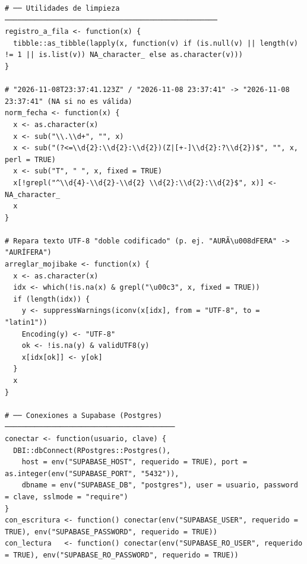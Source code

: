 \begin{lstlisting}[style=anexoR]
# ── Utilidades de limpieza ──────────────────────────────────────────────────
registro_a_fila <- function(x) {
  tibble::as_tibble(lapply(x, function(v) if (is.null(v) || length(v) != 1 || is.list(v)) NA_character_ else as.character(v)))
}

# "2026-11-08T23:37:41.123Z" / "2026-11-08 23:37:41" -> "2026-11-08 23:37:41" (NA si no es válida)
norm_fecha <- function(x) {
  x <- as.character(x)
  x <- sub("\\.\\d+", "", x)
  x <- sub("(?<=\\d{2}:\\d{2}:\\d{2})(Z|[+-]\\d{2}:?\\d{2})$", "", x, perl = TRUE)
  x <- sub("T", " ", x, fixed = TRUE)
  x[!grepl("^\\d{4}-\\d{2}-\\d{2} \\d{2}:\\d{2}:\\d{2}$", x)] <- NA_character_
  x
}

# Repara texto UTF-8 "doble codificado" (p. ej. "AURÃ\u008dFERA" -> "AURÍFERA")
arreglar_mojibake <- function(x) {
  x <- as.character(x)
  idx <- which(!is.na(x) & grepl("\u00c3", x, fixed = TRUE))
  if (length(idx)) {
    y <- suppressWarnings(iconv(x[idx], from = "UTF-8", to = "latin1"))
    Encoding(y) <- "UTF-8"
    ok <- !is.na(y) & validUTF8(y)
    x[idx[ok]] <- y[ok]
  }
  x
}

# ── Conexiones a Supabase (Postgres) ────────────────────────────────────────
conectar <- function(usuario, clave) {
  DBI::dbConnect(RPostgres::Postgres(),
    host = env("SUPABASE_HOST", requerido = TRUE), port = as.integer(env("SUPABASE_PORT", "5432")),
    dbname = env("SUPABASE_DB", "postgres"), user = usuario, password = clave, sslmode = "require")
}
con_escritura <- function() conectar(env("SUPABASE_USER", requerido = TRUE), env("SUPABASE_PASSWORD", requerido = TRUE))
con_lectura   <- function() conectar(env("SUPABASE_RO_USER", requerido = TRUE), env("SUPABASE_RO_PASSWORD", requerido = TRUE))
\end{lstlisting}

